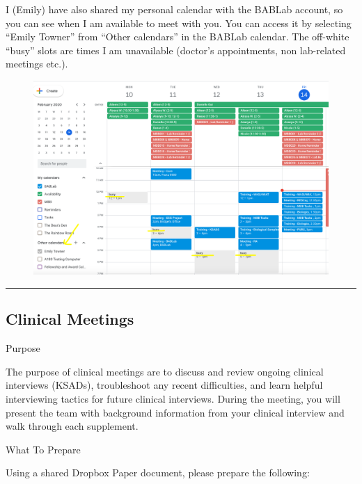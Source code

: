 \documentclass[]{book}
\begin{document}
I (Emily) have also shared my personal calendar with the BABLab account, so you can see when I am available to meet with you. You can access it by selecting ``Emily Towner'' from ``Other calendars'' in the BABLab calendar. The off-white ``busy'' slots are times I am unavailable (doctor's appointments, non lab-related meetings etc.).

\begin{figure}
\centering
\includegraphics{images/lab_protocols/trainee_tuesdays_thursdays/2.png}
\caption{}
\end{figure}

\begin{center}\rule{0.5\linewidth}{0.5pt}\end{center}

\hypertarget{clinical-meetings}{%
\subsection{Clinical Meetings}\label{clinical-meetings}}

Purpose

The purpose of clinical meetings are to discuss and review ongoing clinical interviews (KSADs), troubleshoot any recent difficulties, and learn helpful interviewing tactics for future clinical interviews. During the meeting, you will present the team with background information from your clinical interview and walk through each supplement.

What To Prepare

Using a shared Dropbox Paper document, please prepare the following:
\end{document}
